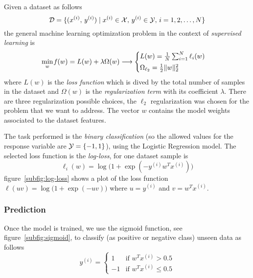 Given a dataset as follows
\[
\mathcal{D}=\{(x^{(i)},\,y^{(i)})\mid x^{(i)}\in\mathcal{X},\,y^{(i)}\in\mathcal{Y},\,i=1,2,\dots,N\}
\]
the general machine learning optimization problem in the context of \emph{supervised learning} is
\[
\min_{w}\operatorname*{\mathit{f}}(w)=L(w)+\lambda\Omega(w)\longrightarrow
\begin{cases}
L(w)=\frac{1}{N}\sum_{i=1}^N\ell_i(w) \\[0.5ex]
\Omega_{\ell_2}=\frac{1}{2}\lVert w\rVert_2^2
\end{cases}
\]
where $L(w)$ is the \emph{loss function} which is dived by the total number of samples in the dataset and $\Omega(w)$ is the \emph{regularization term} with its coefficient $\lambda$. There are three regularization possible choices, the $\ell_2$ regularization was chosen for the problem that we want to address. The vector $w$ contains the model weights associated to the dataset features.

The task performed is the \emph{binary classification} (so the allowed values for the response variable are $\mathcal{Y}=\{-1,1\}$), using the Logistic Regression model. The selected loss function is the \emph{log-loss}, for one dataset sample is
\begin{equation}\label{eq:sample_loss}
\ell_i(w)=\log\bigl(1+\exp(-y^{(i)}w^Tx^{(i)})\bigr)
\end{equation}
figure~\vref{subfig:log-loss} shows a plot of the loss function $\ell(uv)=\log\bigl(1+\exp(-uv)\bigr)$ where $u=y^{(i)}$ and $v=w^Tx^{(i)}$.

\subsubsection*{Prediction}

Once the model is trained, we use the sigmoid function, see figure~\vref{subfig:sigmoid}, to classify (as positive or negative class) unseen data as follows
\[
y^{(i)}=
\begin{cases}
1  & \text{if $w^Tx^{(i)}>0.5$} \\
-1 & \text{if $w^Tx^{(i)}\leq0.5$}
\end{cases}
\]


